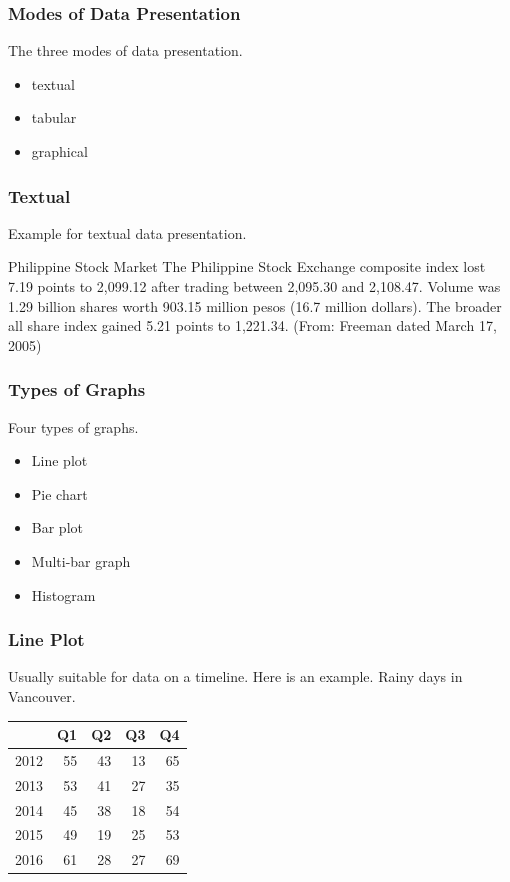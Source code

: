 \documentclass[xcolor=dvipsnames]{beamer}
\begin{document}
\begin{frame}
  \frametitle{Modes of Data Presentation}
The three modes of data presentation.
\begin{itemize}
\item textual
\item tabular
\item graphical
\end{itemize}
\end{frame}

\begin{frame}
  \frametitle{Textual}
Example for textual data presentation.
\begin{block}{Philippine Stock Market}
The Philippine Stock Exchange composite index lost 7.19 points to
2,099.12 after trading between 2,095.30 and 2,108.47. Volume was 1.29
billion shares worth 903.15 million pesos (16.7 million dollars). The
broader all share index gained 5.21 points to 1,221.34. (From: Freeman
dated March 17, 2005)
\end{block}
\end{frame}

\begin{frame}
  \frametitle{Types of Graphs}
Four types of graphs.
\begin{itemize}
\item Line plot
\item Pie chart
\item Bar plot
\item Multi-bar graph
\item Histogram
\end{itemize}
\end{frame}

\begin{frame}
  \frametitle{Line Plot}
Usually suitable for data on a timeline. Here is an example. Rainy
days in Vancouver.

\begin{tabular}{|l|r|r|r|r|}\hline
  & Q1 & Q2 & Q3 & Q4 \\ \hline
2012 & 55 & 43 & 13 & 65 \\ \hline
2013 & 53 & 41 & 27 & 35 \\ \hline
2014 & 45 & 38 & 18 & 54 \\ \hline
2015 & 49 & 19 & 25 & 53 \\ \hline
2016 & 61 & 28 & 27 & 69 \\ \hline
\end{tabular}
\end{frame}
\end{document}

